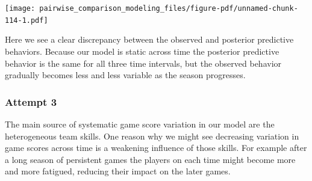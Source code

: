 \documentclass[
  letterpaper,
  DIV=11,
  numbers=noendperiod]{scrartcl}
\newenvironment{Shaded}{\begin{snugshade}}{\end{snugshade}}
\newcommand{\AttributeTok}[1]{\textcolor[rgb]{0.40,0.45,0.13}{#1}}
\newcommand{\ControlFlowTok}[1]{\textcolor[rgb]{0.00,0.23,0.31}{#1}}
\newcommand{\DecValTok}[1]{\textcolor[rgb]{0.68,0.00,0.00}{#1}}
\newcommand{\FunctionTok}[1]{\textcolor[rgb]{0.28,0.35,0.67}{#1}}
\newcommand{\NormalTok}[1]{\textcolor[rgb]{0.00,0.23,0.31}{#1}}
\newcommand{\OtherTok}[1]{\textcolor[rgb]{0.00,0.23,0.31}{#1}}
\newcommand{\SpecialCharTok}[1]{\textcolor[rgb]{0.37,0.37,0.37}{#1}}
\newcommand{\StringTok}[1]{\textcolor[rgb]{0.13,0.47,0.30}{#1}}
\begin{document}
\begin{Shaded}
\end{Shaded}

\texttt{[image: pairwise\_comparison\_modeling\_files/figure-pdf/unnamed-chunk-114-1.pdf]}

Here we see a clear discrepancy between the observed and posterior
predictive behaviors. Because our model is static across time the
posterior predictive behavior is the same for all three time intervals,
but the observed behavior gradually becomes less and less variable as
the season progresses.

\subsubsection{Attempt 3}\label{attempt-3-2}

The main source of systematic game score variation in our model are the
heterogeneous team skills. One reason why we might see decreasing
variation in game scores across time is a weakening influence of those
skills. For example after a long season of persistent games the players
on each time might become more and more fatigued, reducing their impact
on the later games.
\end{document}
